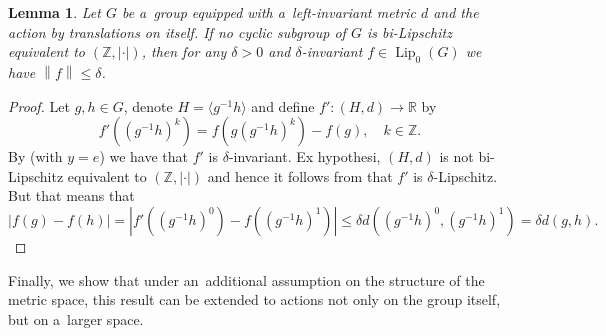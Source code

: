 \documentclass[11pt,a4paper]{amsart}
\newtheorem{lemma}[theorem]{Lemma}
\theoremstyle{definition}
\newcommand{\R}{\mathbb{R}}
\newcommand{\Z}{\mathbb{Z}}
\newcommand{\abs}[1]{\left| #1 \right|}
\newcommand{\norm}[1]{\left\| #1 \right\|}
\newcommand{\Lipz}{\operatorname{Lip}_0}
\begin{document}
	\begin{lemma} \label{lma:badGroup}
		Let $G$ be a~group equipped with a~left-invariant metric $d$ and the action by translations on itself. If no cyclic subgroup of $G$ is bi-Lipschitz equivalent to $(\Z, \abs{\cdot})$, then for any $\delta > 0$ and $\delta$-invariant $f \in \Lipz(G)$ we have $\norm{f} \leq \delta$.
	\end{lemma}
	\begin{proof}
		Let $g, h \in G$, denote $H = \langle g^{-1}h \rangle$ and define $f': (H, d) \to \R$ by
		\begin{equation*}
			f'((g^{-1}h)^k) = f(g(g^{-1}h)^k) - f(g), \quad k \in \Z.
		\end{equation*}
		By  (with $y=e$) we have that $f'$ is $\delta$-invariant. Ex hypothesi, $(H, d)$ is not bi-Lipschitz equivalent to $(\Z, \abs{\cdot})$ and hence it follows from  that $f'$ is $\delta$-Lipschitz. But that means that
		\begin{equation*}
			\abs{f(g) - f(h)}
			= \abs{f'((g^{-1}h)^0) - f((g^{-1}h)^1)}
			\leq \delta d((g^{-1}h)^0, (g^{-1}h)^1)
			= \delta d(g, h).
		\end{equation*}		
	\end{proof}
	
	Finally, we show that under an~additional assumption on the structure of the metric space, this result can be extended to actions not only on the group itself, but on a~larger space.
	
\end{document}
